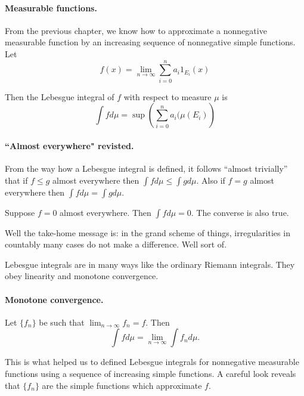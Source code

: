 \documentclass[12pt,english,oneside]{scrbook}
\numberwithin{equation}{chapter}
\theoremstyle{definition}
\theoremstyle{plain}
\begin{document}
\paragraph{Measurable functions.}

From the previous chapter, we know how to approximate a nonnegative measurable function by an increasing sequence of nonnegative simple functions. Let
\begin{equation}
  f(x) = \lim_{n\to \infty} \sum_{i=0}^n a_i 1_{E_i}(x)
\end{equation}

Then the Lebesgue integral of $f$ with respect to measure $\mu$ is
\begin{equation}
  \int f d\mu = \sup \left( \sum_{i=0}^n a_i (\mu (E_i) \right)
\end{equation}

\paragraph{``Almost everywhere" revisted.}

From the way how a Lebesgue integral is defined, it follows ``almost trivially'' that if $f\leq g$ almost everywhere then $\int f d\mu \leq \int g d\mu$. Also if $f=g$ almost everywhere then $\int f d\mu = \int g d\mu$.

Suppose $f=0$ almost everywhere. Then $\int f d\mu = 0$. The converse is also true.

Well the take-home message is: in the grand scheme of things, irregularities in countably many cases do not make a difference. Well sort of.

Lebesgue integrals are in many ways like the ordinary Riemann integrals. They obey linearity and monotone convergence.

\paragraph{Monotone convergence.}

Let $\{f_n\}$ be such that $\lim_{n\to \infty} f_n = f$. Then
\begin{equation}
  \int f d\mu = \lim_{n\to\infty} \int f_n d\mu.
\end{equation}

This is what helped us to defined Lebesgue integrals for nonnegative measurable functions using a sequence of increasing simple functions. A careful look reveals that $\{f_n\}$ are the simple functions which approximate $f$.
\end{document}
